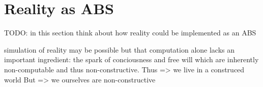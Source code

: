 \section{Reality as ABS}
TODO: in this section think about how reality could be implemented as an ABS

simulation of reality may be possible but that computation alone lacks an important ingredient: the spark of conciousness and free will which are inherently non-computable and thus non-constructive. 
Thus => we live in a construced world
But => we ourselves are non-constructive